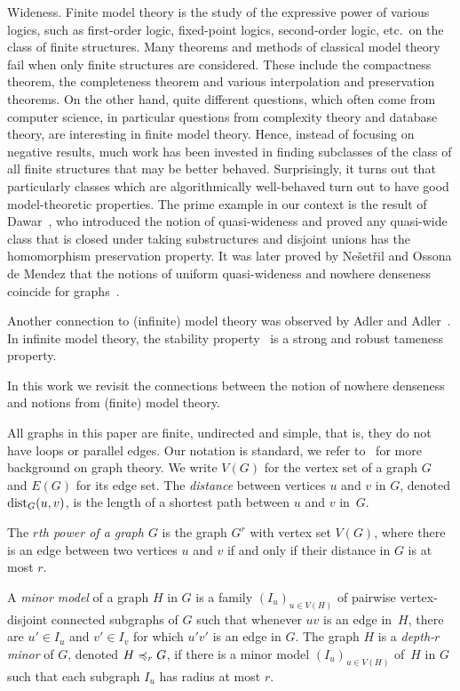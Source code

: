 \smallskip
Wideness.
Finite model theory is the study of the expressive power 
of various logics, such as first-order logic, fixed-point logics, second-order 
logic, etc.\ on the class of finite structures. Many theorems and 
methods of classical model theory fail when only finite structures 
are considered. These include the compactness theorem, the completeness 
theorem and various interpolation and preservation theorems.
On the other hand, quite different questions, which often come from
computer science, in particular questions from complexity theory and database
theory, are interesting in finite model theory. Hence, instead of focusing 
on negative results, much work has been invested in finding 
subclasses of the class of all finite structures that may be better behaved.
Surprisingly, it turns out that particularly classes which are 
algorithmically well-behaved turn out to have good model-theoretic 
properties. The prime example in our context is the result of 
Dawar~\cite{dawar2010homomorphism}, who introduced the notion of
quasi-wideness and proved any quasi-wide class that is closed under taking substructures
and disjoint unions has the homomorphism preservation property. It was 
later proved by Ne\v{s}et\v{r}il and Ossona de Mendez that 
the notions of uniform quasi-wideness and nowhere denseness coincide for 
graphs~\cite{nevsetvril2011nowhere}.

Another connection to (infinite) model theory was observed by Adler and
Adler~\cite{adler2014interpreting}. In infinite model theory, the 
stability property~\cite{shelah1990classification} is a strong and 
robust tameness property. 


In this work we revisit the connections between the notion of nowhere 
denseness and notions from (finite) model theory.

All graphs in this paper are finite, undirected and simple, that is, 
they do not have loops or parallel edges. Our notation is standard,
we refer to~\cite{diestel2012graph} for more background on 
graph theory. 
We write $V(G)$ for the vertex set of a graph $G$ and
$E(G)$ for its edge set. 
The {\em{distance}} between vertices $u$ and $v$ in $G$, denoted $\mathrm{dist}_G(u,v)$, is the length of a shortest path between $u$ and $v$ in~$G$.

The \emph{$r$th power of a graph $G$} is the graph $G^r$
with vertex set $V(G)$, where there is an edge between two 
vertices $u$ and $v$ if and only if their distance in $G$ is at most $r$. 

A {\em{minor model}} of a graph $H$ in $G$ is a family $(I_u)_{u\in V(H)}$ of pairwise vertex-disjoint connected subgraphs of $G$
such that whenever $uv$ is an edge in~$H$, there are $u'\in I_u$ and $v'\in I_v$ for which $u'v'$ 
is an edge in $G$.
The graph $H$ is a {\em{depth-$r$ minor}} of $G$, denoted $H\preccurlyeq_rG$, if there is a minor model
$(I_u)_{u\in V(H)}$ of~$H$ in $G$ such that each subgraph $I_u$ has radius at most $r$.

